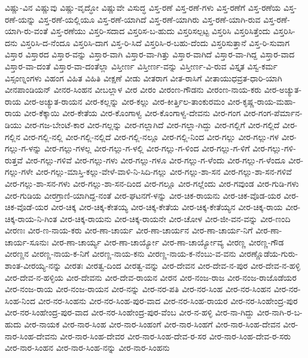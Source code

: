 ವಿಷ್ಣು-ವಿನ
ವಿಷ್ಣುವು
ವಿಷ್ಣು-ವೃದ್ಧೋ
ವಿಷ್ಣುವೇ
ವಿಸುದ್ಧ
ವಿಸ್ತ-ರಣೆ
ವಿಸ್ತ-ರಣೆ-ಗಳು
ವಿಸ್ತ-ರಣೆಗೆ
ವಿಸ್ತ-ರಣೆಯ
ವಿಸ್ತ-ರಣೆ-ಯನ್ನು
ವಿಸ್ತ-ರಣೆ-ಯಲ್ಲಿಯೂ
ವಿಸ್ತ-ರಣೆ-ಯಾಗಿದೆ
ವಿಸ್ತ-ರಣೆ-ಯಾಗಿರು
ವಿಸ್ತ-ರಣೆ-ಯಾಗಿ-ರುವ
ವಿಸ್ತ-ರಣೆ-ಯಾಗಿ-ರು-ವಂತೆ
ವಿಸ್ತ-ರಣೆಯು
ವಿಸ್ತರಿ-ಸದಾದ
ವಿಸ್ತರಿಸ-ಬ-ಹುದು
ವಿಸ್ತರಿಸಲ್ಪಟ್ಟ
ವಿಸ್ತರಿಸಿ
ವಿಸ್ತರಿಸಿತ್ತೆಂದು
ವಿಸ್ತರಿಸಿ-ದನು
ವಿಸ್ತರಿಸಿ-ದ-ನೆಂದೂ
ವಿಸ್ತರಿಸಿ-ದಾಗ
ವಿಸ್ತ-ರಿ-ಸಿದೆ
ವಿಸ್ತರಿಸಿ-ರ-ಬಹು-ದೆಂದು
ವಿಸ್ತರಿಸುತ್ತಾನೆ
ವಿಸ್ತ-ರಿ-ಸುವಾಗ
ವಿಸ್ತಾರ
ವಿಸ್ತಾರದ
ವಿಸ್ತಾರ-ವನ್ನು
ವಿಸ್ತಾರ-ವಾಗಿ
ವಿಸ್ತಾರ-ವಾ-ಗಿತ್ತು
ವಿಸ್ತಾರ-ವಾಗಿದೆ
ವಿಸ್ತಾರ-ವಾ-ಗಿದ್ದ
ವಿಸ್ತಾರ-ವಾದ
ವಿಸ್ತಾರ-ವಾ-ದಂತೆ
ವಿಸ್ತಾರ-ವಾ-ದಂತೆಲ್ಲಾ
ವಿಸ್ತೀರ್ಣ
ವಿಸ್ತೀರ್ಣ-ವನ್ನು
ವಿಸ್ತೀರ್ಣ-ವಿ-ರುವ
ವಿಸ್ತೃತ
ವಿಸ್ವ-ಕರ್ಮ
ವಿಸ್ಸಂಣ್ನಂಗಳು
ವಿಹಂಗ
ವಿಹಿತ
ವಿಹಿತಿ
ವೀಕ್ಷಣೆ
ವೀಡು
ವೀತರಾಗ
ವೀತ-ರಾಸಿಗೆ
ವೀತಾಯುಧವ್ರತ-ಧಾರಿ-ಯಾಗಿ
ವೀನಪಾಂಡಿಯನ್
ವೀನರ-ಸಿಂಹನ
ವೀಬಲ್ಲಾಳ
ವೀರ
ವೀರಂ
ವೀರಂಣ-ಗೌಡನು
ವೀರಂಣ-ನಾಯ-ಕರು
ವೀರ-ಅಚ್ಯುತ-ರಾಯ
ವೀರ-ಅಚ್ಯುತ-ರಾಯನ
ವೀರ-ಕಲ್ಲನ್ನು
ವೀರ-ಕಲ್ಲು
ವೀರ-ಕೀರ್ತ್ತಿಲ-ತಾಂಕುರಮಂ
ವೀರ-ಕೃಷ್ಣ-ರಾಯ-ಮಹಾ-ರಾಯ
ವೀರ-ಕೆಕ್ಕಾಯಿ
ವೀರ-ಕೇತೆಯ
ವೀರ-ಕೊಂಗಾಳ್ವ
ವೀರ-ಕೊಂಗಾಳ್ವ-ದೇವನು
ವೀರ-ಗಂಗ
ವೀರ-ಗಂಗ-ಪೆರ್ಮಾನ-ಡಿಯು
ವೀರ-ಗಜ-ಬೇಂಟೆ-ಕಾರ
ವೀರ-ಗಲ್ಲನ್ನು
ವೀರ-ಗಲ್ಲಾಗಿದೆ
ವೀರ-ಗಲ್ಲಾ-ಗಿದ್ದು
ವೀರ-ಗಲ್ಲಿಗೆ
ವೀರ-ಗಲ್ಲಿದೆ
ವೀರ-ಗಲ್ಲಿನ
ವೀರ-ಗಲ್ಲಿ-ನಲ್ಲಿ
ವೀರ-ಗಲ್ಲಿ-ನಲ್ಲಿದೆ
ವೀರ-ಗಲ್ಲಿ-ನಲ್ಲೂ
ವೀರ-ಗಲ್ಲಿ-ನಿಂದ
ವೀರ-ಗಲ್ಲು
ವೀರ-ಗಲ್ಲು-ಗಳ
ವೀರ-ಗಲ್ಲು-ಗ-ಳನ್ನು
ವೀರ-ಗಲ್ಲು-ಗಳಲ್ಲ
ವೀರ-ಗಲ್ಲು-ಗ-ಳಲ್ಲಿ
ವೀರ-ಗಲ್ಲು-ಗ-ಳಿಂದ
ವೀರ-ಗಲ್ಲು-ಗ-ಳಿಗೆ
ವೀರ-ಗಲ್ಲು-ಗಳಿ-ರುತ್ತವೆ
ವೀರ-ಗಲ್ಲು-ಗಳಿವೆ
ವೀರ-ಗಲ್ಲು-ಗಳು
ವೀರ-ಗಲ್ಲು-ಗಳೂ
ವೀರ-ಗಲ್ಲು-ಗ-ಳೆಂದು
ವೀರ-ಗಲ್ಲು-ಗ-ಳೆಂದೂ
ವೀರ-ಗಲ್ಲು-ಗಳೇ
ವೀರ-ಗಲ್ಲು-ಮಾಸ್ತಿ-ಕಲ್ಲು-ವೇಳೆ-ವಾಳಿ-ನಿ-ಸಿದಿ-ಗಲ್ಲು
ವೀರ-ಗಲ್ಲು-ಶಾ-ಸನ
ವೀರ-ಗಲ್ಲು-ಶಾ-ಸನ-ಗಳಿವೆ
ವೀರ-ಗಲ್ಲು-ಶಾ-ಸನ-ಗಳು
ವೀರ-ಗಲ್ಲು-ಶಾ-ಸನ-ದಿಂದ
ವೀರ-ಗಲ್ಲೂ
ವೀರ-ಗಲ್ಲೆಂದು
ವೀರ-ಗವುಂಡ
ವೀರ-ಗುಡಿ-ಗಳು
ವೀರ-ಗುಡಿಯ
ವೀರಗ್ರಾಣಿ-ಯಾಗಿದ್ದ-ನಂತೆ
ವೀರ-ಘಟನಗೆ-ಳನ್ನು
ವೀರ-ಚಿಕ-ರಾಯನು
ವೀರ-ಚಿಕ-ವೊಡ-ಯರ
ವೀರ-ಚಿಕ-ವೊಡೆ-ಯರ
ವೀರ-ಚಿಕ್ಕ
ವೀರ-ಚಿಕ್ಕ-ಕೇತಯ್ಯ
ವೀರ-ಚಿಕ್ಕ-ಕೇತೆಯ
ವೀರ-ಚಿಕ್ಕ-ಕೇತೆಯ್ಯನ
ವೀರ-ಚಿಕ್ಕ-ರಾಯ
ವೀರ-ಚಿಕ್ಕ-ರಾಯ-ನಿ-ಗಿಂತ
ವೀರ-ಚಿಕ್ಕ-ರಾಯನು
ವೀರ-ಚಿಕ್ಕ-ರಾಯನೇ
ವೀರ-ಚೋಳ
ವೀರ-ಜೀ-ವನ-ವನ್ನು
ವೀರ-ಣಂದಿ
ವೀರಣಃ
ವೀರ-ಣ-ನಾಯ-ಕರು
ವೀರ-ಣಾ-ಚಾರ್ಯ
ವೀರ-ಣಾ-ಚಾರ್ಯನ
ವೀರ-ಣಾ-ಚಾರ್ಯ-ನಿಗೆ
ವೀರ-ಣಾ-ಚಾರ್ಯ-ಸೂನುಃ
ವೀರ-ಣಾ-ಚಾರ್ಯ್ಯ
ವೀರ-ಣಾ-ಚಾರ್ಯ್ಯೋ
ವೀರ-ಣಾ-ಚಾರ್ಯ್ಯೋವ್ಯ
ವೀರಣ್ಣ
ವೀರಣ್ಣ-ಗೌಡ
ವೀರಣ್ಣನ
ವೀರಣ್ಣ-ನಾಯ-ಕ-ನಿಗೆ
ವೀರಣ್ಣ-ನಾಯ-ಕನು
ವೀರಣ್ಣ-ನಾಯ-ಕ-ನೆಂಬು-ವ-ವನು
ವೀರಣ್ಣೊಡೆಯ-ಗುರು-ಶಾಂತ-ವೀರಯ್ಯ-ನನ್ನು
ವೀರತಃ
ವೀರತ್ವ-ದಿಂದ
ವೀರತ್ವ-ವನ್ನು
ವೀರ-ದೇವನ
ವೀರ-ದೇವ-ನ-ಪುರ
ವೀರ-ದೇವ-ನ-ಹಳ್ಳಿ
ವೀರ-ದೇವ-ನ-ಹಳ್ಳಿಯ
ವೀರ-ದೇವನು
ವೀರ-ದೇವ-ರಾಯನ
ವೀರನ
ವೀರ-ನಂಜ-ರಾಜ
ವೀರ-ನಂಜ-ರಾಜೊಡೆಯರ
ವೀರ-ನಂಜ-ರಾಯ
ವೀರ-ನಂಜ-ರಾಯನ
ವೀರ-ನನ್ನು
ವೀರ-ನರ-ಪತಿ
ವೀರ-ನರ-ಸಿಂಹ
ವೀರ-ನರ-ಸಿಂಹನ
ವೀರ-ನರ-ಸಿಂಹ-ನಿಂದ
ವೀರ-ನರ-ಸಿಂಹನು
ವೀರ-ನರ-ಸಿಂಹ-ಪುರ-ವಾದ
ವೀರ-ನರ-ಸಿಂಹ-ರಾಯರ
ವೀರ-ನರ-ಸಿಂಹೇಂದ್ರ-ಪುರ
ವೀರ-ನರ-ಸಿಂಹೇಂದ್ರ-ಪುರ-ವಾದ
ವೀರ-ನರ-ಸಿಂಹೇಂದ್ರ-ಪುರ-ವೆಂಬ
ವೀರ-ನ-ಹಳ್ಳಿ
ವೀರ-ನಾ-ಗಿದ್ದು
ವೀರ-ನಾಗಿ-ರ-ಬ-ಹುದು
ವೀರ-ನಾಯಕ
ವೀರ-ನಾರ-ಸಿಂಹ
ವೀರ-ನಾರ-ಸಿಂಹಂಗೆ
ವೀರ-ನಾರ-ಸಿಂಹಗೆ
ವೀರ-ನಾರ-ಸಿಂಹ-ದೇವನ
ವೀರ-ನಾರ-ಸಿಂಹ-ದೇವನು
ವೀರ-ನಾರ-ಸಿಂಹ-ದೇವರ
ವೀರ-ನಾರ-ಸಿಂಹ-ದೇವ-ರ-ಸರ
ವೀರ-ನಾರ-ಸಿಂಹ-ದೇವ-ರ-ಸರು
ವೀರ-ನಾರ-ಸಿಂಹನ
ವೀರ-ನಾರ-ಸಿಂಹ-ನನ್ನು
ವೀರ-ನಾರ-ಸಿಂಹನು
